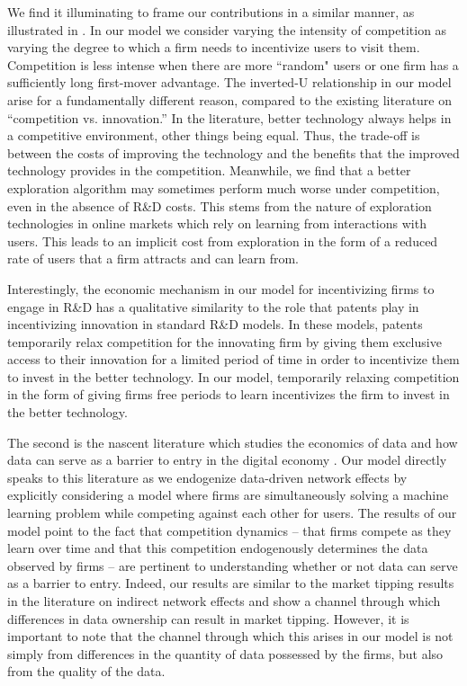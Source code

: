 We find it illuminating to frame our contributions in a similar manner, as illustrated in . In our model we consider varying the intensity of competition as varying the degree to which a firm needs to incentivize users to visit them. Competition is less intense when there are more ``random" users or one firm has a sufficiently long first-mover advantage. The inverted-U relationship in our model arise for a fundamentally different reason, compared to the existing literature on ``competition vs. innovation.'' In the literature, better technology always helps in a competitive environment, other things being equal. Thus, the trade-off is between the costs of improving the technology and the benefits that the improved technology provides in the competition. Meanwhile, we find that a better exploration algorithm may sometimes perform much worse under competition, even in the absence of R\&D costs. This stems from the nature of exploration technologies in online markets which rely on learning from interactions with users. This leads to an implicit cost from exploration in the form of a reduced rate of users that a firm attracts and can learn from.

Interestingly, the economic mechanism in our model for incentivizing firms to engage in R\&D has a qualitative similarity to the role that patents play in incentivizing innovation in standard R\&D models. In these models, patents temporarily relax competition for the innovating firm by giving them exclusive access to their innovation for a limited period of time in order to incentivize them to invest in the better technology. In our model, temporarily relaxing competition in the form of giving firms free periods to learn incentivizes the firm to invest in the better technology.

The second is the nascent literature which studies the economics of data and how data can serve as a barrier to entry in the digital economy \cite{de2020data, hagiu2020data}. Our model directly speaks to this literature as we endogenize data-driven network effects by explicitly considering a model where firms are simultaneously solving a machine learning problem while competing against each other for users. The results of our model point to the fact that competition dynamics -- that firms compete as they learn over time and that this competition endogenously determines the data observed by firms -- are pertinent to understanding whether or not data can serve as a barrier to entry. Indeed, our results are similar to the market tipping results in the literature on indirect network effects and show a channel through which differences in data ownership can result in market tipping. However, it is important to note that the channel through which this arises in our model is not simply from differences in the quantity of data possessed by the firms, but also from the quality of the data.

